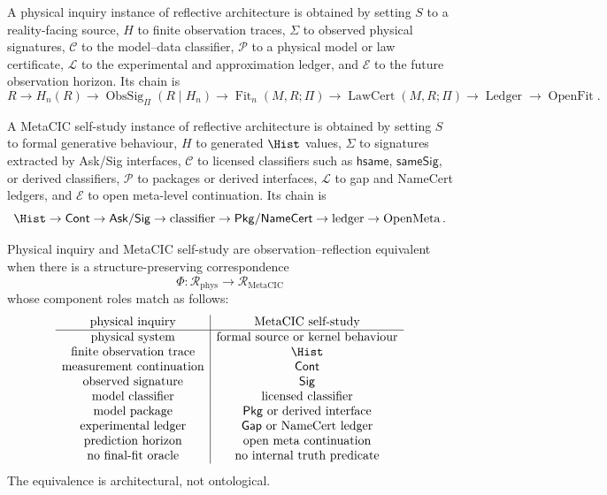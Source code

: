 \begin{definition}
\label{def:physical-inquiry-instance}
A physical inquiry instance of reflective architecture is obtained by setting $S$ to a reality-facing source, $H$ to finite observation traces, $\Sigma$ to observed physical signatures, $\mathcal C$ to the model--data classifier, $\mathcal P$ to a physical model or law certificate, $\mathcal L$ to the experimental and approximation ledger, and $\mathcal E$ to the future observation horizon. Its chain is
$$
R
\to
H_n(R)
\to
\operatorname{ObsSig}_{\Pi}(R\mid H_n)
\to
\operatorname{Fit}_n(M,R;\Pi)
\to
\operatorname{LawCert}(M,R;\Pi)
\to
\operatorname{Ledger}
\to
\operatorname{OpenFit}.
$$
\end{definition}

\begin{definition}
\label{def:metacic-self-study}
A MetaCIC self-study instance of reflective architecture is obtained by setting $S$ to formal generative behaviour, $H$ to generated $\Hist$ values, $\Sigma$ to signatures extracted by Ask/Sig interfaces, $\mathcal C$ to licensed classifiers such as $\mathsf{hsame}$, $\mathsf{sameSig}$, or derived classifiers, $\mathcal P$ to packages or derived interfaces, $\mathcal L$ to gap and NameCert ledgers, and $\mathcal E$ to open meta-level continuation. Its chain is
$$
\Hist
\to
\mathsf{Cont}
\to
\mathsf{Ask}/\mathsf{Sig}
\to
\text{classifier}
\to
\mathsf{Pkg}/\mathsf{NameCert}
\to
\text{ledger}
\to
\operatorname{OpenMeta}.
$$
\end{definition}

\begin{definition}
\label{def:observation-reflection-equivalence}
Physical inquiry and MetaCIC self-study are observation--reflection equivalent when there is a structure-preserving correspondence
$$
\Phi:
\mathcal R_{\mathrm{phys}}
\longrightarrow
\mathcal R_{\mathrm{MetaCIC}}
$$
whose component roles match as follows:
$$
\begin{array}{c|c}
\text{physical inquiry} & \text{MetaCIC self-study}\\
\hline
\text{physical system} & \text{formal source or kernel behaviour}\\
\text{finite observation trace} & \Hist\\
\text{measurement continuation} & \mathsf{Cont}\\
\text{observed signature} & \mathsf{Sig}\\
\text{model classifier} & \text{licensed classifier}\\
\text{model package} & \mathsf{Pkg}\text{ or derived interface}\\
\text{experimental ledger} & \mathsf{Gap}\text{ or NameCert ledger}\\
\text{prediction horizon} & \text{open meta continuation}\\
\text{no final-fit oracle} & \text{no internal truth predicate}
\end{array}
$$
The equivalence is architectural, not ontological.
\end{definition}

